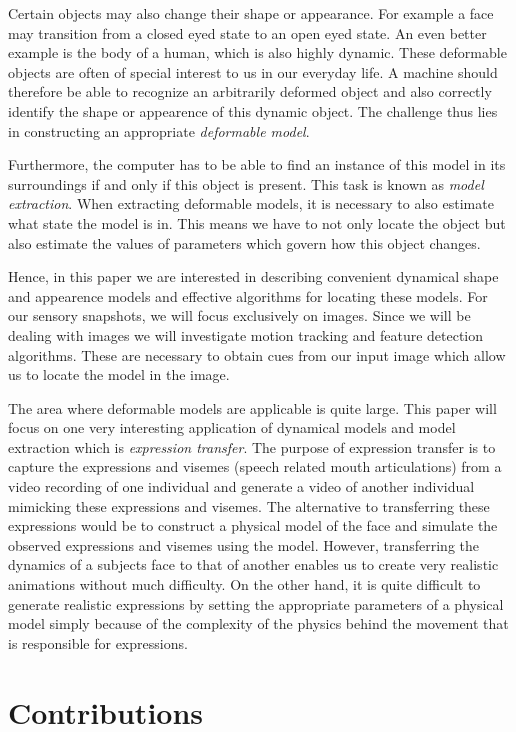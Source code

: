 \documentclass[11pt,a4paper]{book}
\begin{document}
Certain objects may also change their shape or
appearance. For example a face may transition from a closed eyed state to an
open eyed state. An even better example is the body of a human, which is also
highly dynamic. These deformable objects are often of special interest to us in
our everyday life. A machine should therefore be able to recognize an arbitrarily deformed
object and also correctly identify the shape or appearence of this dynamic
object. The challenge thus lies in constructing an appropriate \textit{deformable
model}. 

Furthermore, the computer has to be able to find an instance of this
model in its surroundings if and only if this object is present. This task is
known as \textit{model extraction}. When extracting deformable models, it is
necessary to also estimate what state the model is in. This means we have to not
only locate the object but also estimate the values of parameters which govern how this
object changes.

Hence, in this paper we are interested in describing convenient dynamical shape
and appearence models and effective algorithms for locating these models. For our
sensory snapshots, we will focus exclusively on images. Since we will be dealing
with images we will investigate motion tracking and feature detection
algorithms. These are necessary to obtain cues from our input image which allow
us to locate the model in the image.

 The area where deformable models
are applicable is quite large. This paper will focus on one very interesting application of dynamical
models and model extraction which is
\textit{expression transfer}.  The purpose of expression transfer is to capture the expressions and visemes
(speech related mouth articulations) from a video recording of one individual and
generate a video of another individual mimicking these
expressions and visemes. The alternative to transferring these expressions would
be to construct a physical model of the face and simulate the observed
expressions and visemes using the model. However, transferring the dynamics of a subjects face to that of another enables us to
create very realistic animations without much difficulty. On the other hand, it
is quite difficult to generate realistic expressions by setting the appropriate
parameters of a physical model simply because of the complexity of the physics
behind the movement that is responsible for expressions.

\section{Contributions}
\end{document}
